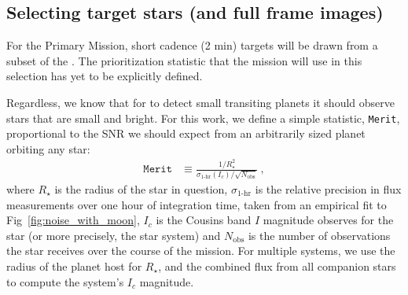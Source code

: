 \subsection{Selecting target stars (and full frame images)}
\label{sec:selection_criteria}
For the Primary Mission, \tesss short cadence (2 min) targets will be drawn from a subset of the \tic. 
The prioritization statistic that the mission will use in this selection has yet to be explicitly defined.

Regardless, we know that for \tess to detect small transiting planets
it should observe stars that are small and bright.  For this work, we
define a simple statistic, \texttt{Merit}, proportional to the SNR we
should expect from an arbitrarily sized planet orbiting any star:
\begin{align}
\texttt{Merit} &\equiv 
	\frac{1/R_\star^2}{\sigma_\text{1-hr}(I_c)/\sqrt{N_\text{obs}}}\ ,
\label{eq:merit}
\end{align}
where $R_\star$ is the radius of the star in question,
$\sigma_\text{1-hr}$ is the relative precision in flux measurements
over one hour of integration time, taken from an empirical fit to
Fig~\ref{fig:noise_with_moon}, $I_c$ is the Cousins band $I$ magnitude
\tess observes for the star (or more precisely, the star system) and
$N_\text{obs}$ is the number of observations the star receives over
the course of the mission.  For multiple systems, we use the radius of
the planet host for $R_\star$, and the combined flux from all
companion stars to compute the system's $I_c$ magnitude.

